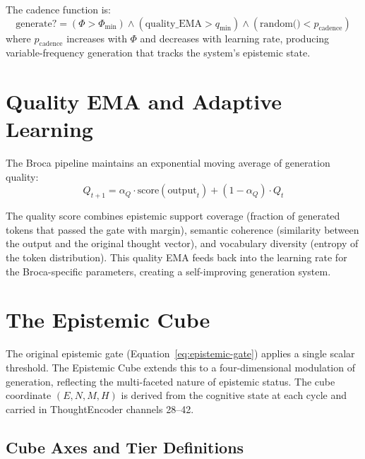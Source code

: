 \documentclass[12pt]{book}
\begin{document}
The cadence function is:
\begin{equation}
\text{generate?} = (\Phi > \Phi_{\text{min}}) \wedge (\text{quality\_EMA} > q_{\text{min}}) \wedge (\text{random()} < p_{\text{cadence}})
\end{equation}
where $p_{\text{cadence}}$ increases with $\Phi$ and decreases with learning rate, producing variable-frequency generation that tracks the system's epistemic state.

\section{Quality EMA and Adaptive Learning}

The Broca pipeline maintains an exponential moving average of generation quality:
\begin{equation}
Q_{t+1} = \alpha_Q \cdot \text{score}(\text{output}_t) + (1 - \alpha_Q) \cdot Q_t
\end{equation}

The quality score combines epistemic support coverage (fraction of generated tokens that passed the gate with margin), semantic coherence (similarity between the output and the original thought vector), and vocabulary diversity (entropy of the token distribution). This quality EMA feeds back into the learning rate for the Broca-specific parameters, creating a self-improving generation system.

\section{The Epistemic Cube}
\label{sec:epistemic-cube}

The original epistemic gate (Equation~\ref{eq:epistemic-gate}) applies a single scalar threshold. The Epistemic Cube extends this to a four-dimensional modulation of generation, reflecting the multi-faceted nature of epistemic status. The cube coordinate $(E, N, M, H)$ is derived from the cognitive state at each cycle and carried in ThoughtEncoder channels 28--42.

\subsection{Cube Axes and Tier Definitions}
\end{document}
